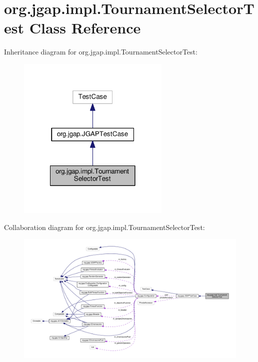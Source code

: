 \hypertarget{classorg_1_1jgap_1_1impl_1_1_tournament_selector_test}{\section{org.\-jgap.\-impl.\-Tournament\-Selector\-Test Class Reference}
\label{classorg_1_1jgap_1_1impl_1_1_tournament_selector_test}
}


Inheritance diagram for org.\-jgap.\-impl.\-Tournament\-Selector\-Test\-:
\nopagebreak
\begin{figure}[H]
\begin{center}
\leavevmode
\includegraphics[width=206pt]{classorg_1_1jgap_1_1impl_1_1_tournament_selector_test__inherit__graph}
\end{center}
\end{figure}


Collaboration diagram for org.\-jgap.\-impl.\-Tournament\-Selector\-Test\-:
\nopagebreak
\begin{figure}[H]
\begin{center}
\leavevmode
\includegraphics[width=350pt]{classorg_1_1jgap_1_1impl_1_1_tournament_selector_test__coll__graph}
\end{center}
\end{figure}
